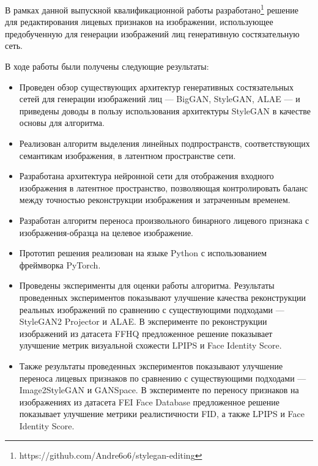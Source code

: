В рамках данной выпускной квалификационной работы разработано\footnote{https://github.com/Andre6o6/stylegan-editing} решение для редактирования лицевых признаков на изображении, использующее предобученную для генерации изображений лиц генеративную состязательную сеть.

В ходе работы были получены следующие результаты:

\begin{itemize}
\item Проведен обзор существующих архитектур генеративных состязательных сетей для генерации изображений лиц --- BigGAN, StyleGAN, ALAE --- и приведены доводы в пользу использования архитектуры StyleGAN в качестве основы для алгоритма.
\item Реализован алгоритм выделения линейных подпространств, соответствующих семантикам изображения, в латентном пространстве сети.
\item Разработана архитектура нейронной сети для отображения входного изображения в латентное пространство, позволяющая контролировать баланс между точностью реконструкции изображения и затраченным временем.
\item Разработан алгоритм переноса произвольного бинарного лицевого признака с изображения-образца на целевое изображение. 
\item Прототип решения реализован на языке Python с использованием фреймворка PyTorch.
\item Проведены эксперименты для оценки работы алгоритма. Результаты проведенных экспериментов показывают улучшение качества реконструкции реальных изображений по сравнению с существующими подходами --- StyleGAN2 Projector и ALAE. В эксперименте по реконструкции изображений из датасета FFHQ предложенное решение показывает улучшение метрик визуальной схожести LPIPS и Face Identity Score.
\item Также результаты проведенных экспериментов показывают улучшение переноса лицевых признаков по сравнению с существующими подходами --- Image2StyleGAN и GANSpace.  В эксперименте по переносу признаков на изображениях из датасета FEI Face Database предложенное решение показывает улучшение метрики реалистичности FID, а также LPIPS и Face Identity Score.
\end{itemize}